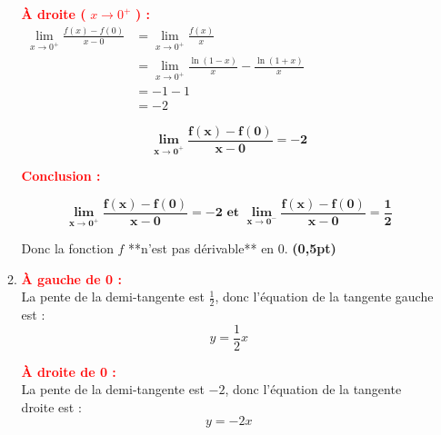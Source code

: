 \documentclass[12pt,a4paper]{article}
\begin{document}
\begin{enumerate}
\begin{enumerate}
                    \textcolor{red}{\textbf{À droite (} \( x \to 0^+ \) \textbf{) :}}\\

                    \(
                    \begin{aligned}
                        \lim\limits_{x \to 0^+} \frac{f(x)-f(0)}{x-0} & = \lim\limits_{x \to 0^+} \frac{f(x)}{x}                             \\
                                                                      & = \lim\limits_{x \to 0^+}\frac{\ln(1 - x)}{x} - \frac{\ln(1 + x)}{x} \\
                                                                      & =-1-1                                                                \\
                                                                      & =-2
                    \end{aligned}
                    \)

                    \begin{resultbox}
                        \[
                            \mathbf{\lim\limits_{x \to 0^+} \frac{f(x)-f(0)}{x-0}=-2}
                        \]
                    \end{resultbox}

                    \textcolor{red}{\textbf{Conclusion :}}\\

                    \begin{resultbox}
                        \[
                            \mathbf{\lim\limits_{x \to 0^+} \frac{f(x)-f(0)}{x-0}=-2 \text{ et } \lim\limits_{x \to 0^-} \frac{f(x)-f(0)}{x-0}=\frac{1}{2}}
                        \]
                    \end{resultbox}

                    Donc la fonction \( f \) **n’est pas dérivable** en 0. \hfill \textbf{(0,5pt)}

              \item 
                    \textcolor{red}{\textbf{À gauche de 0 :}}\\
                    La pente de la demi-tangente est \( \frac{1}{2} \), donc l'équation de la tangente gauche est :
                    \[
                        y = \frac{1}{2}x
                    \]

                    \textcolor{red}{\textbf{À droite de 0 :}}\\
                    La pente de la demi-tangente est \( -2 \), donc l'équation de la tangente droite est :
                    \[
                        y = -2x
                    \]


\end{enumerate}
\end{enumerate}
\end{document}
